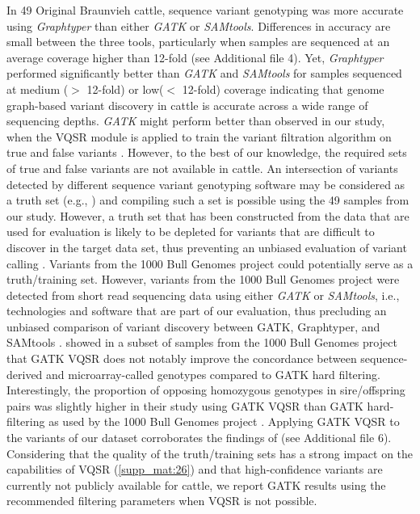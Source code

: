 \documentclass[../main.tex]{subfiles}
\begin{document}
In 49 Original Braunvieh cattle, sequence variant genotyping was more accurate using \emph{Graphtyper} than either \emph{GATK} or \emph{SAMtools}. Differences in accuracy are small between the three tools, particularly when samples are sequenced at an average coverage higher than 12-fold (see Additional file 4). Yet, \emph{Graphtyper} performed significantly better than \emph{GATK} and \emph{SAMtools} for samples sequenced at medium ($>$ 12-fold) or low($<$ 12-fold)
coverage indicating that genome graph-based variant discovery in cattle is accurate across a wide range of sequencing depths. \emph{GATK} might perform better than observed in our study, when the VQSR module is applied to train the variant filtration algorithm on true and false variants \citep{pirooznia2014validation}. However, to the best of our knowledge, the required sets of true and false variants are not available in cattle. An intersection of variants detected by different sequence variant genotyping software may be considered as a truth set (e.g., \citep{alberto2018convergent}) and compiling such a set is possible using the 49 samples from our study. However, a truth set that has been constructed from the data that are used for evaluation is likely to be depleted for variants that are difficult to discover in the target data set, thus preventing an unbiased evaluation of variant calling \citep{li2018synthetic}. Variants from the 1000 Bull Genomes project \citep{Daetwyler2014,Hayes2019} could potentially serve as a truth/training set. However, variants from the 1000 Bull Genomes project were detected from short read sequencing data using either \emph{GATK} or \emph{SAMtools}, i.e., technologies and software that are part of our evaluation, thus precluding an unbiased comparison of variant discovery between GATK, Graphtyper, and SAMtools \citep{li2018synthetic}. \citep{vander2018best} showed in a subset of samples from the 1000 Bull Genomes project that GATK VQSR does not notably improve the concordance between sequence-derived and microarray-called genotypes compared to GATK hard filtering. Interestingly, the proportion of opposing homozygous genotypes in sire/offspring pairs was slightly higher in their study using GATK VQSR than GATK hard-filtering as used by the 1000 Bull Genomes project \citep{vander2018best}. Applying GATK VQSR to the variants of our dataset corroborates the findings of \citep{vander2018best} (see Additional file 6). Considering that the quality of the truth/training sets has a strong impact on the capabilities of VQSR (\ref{supp_mat:26}) and that high-confidence variants are currently not publicly available for cattle, we report GATK results using the recommended filtering parameters when VQSR is not possible.
\end{document}
